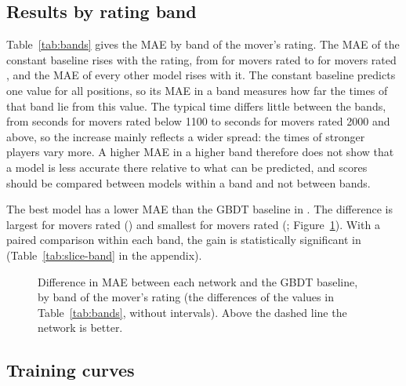 \documentclass[11pt]{article}
\begin{document}
\subsection{Results by rating band}

Table~\ref{tab:bands} gives the MAE by band of the mover's rating. The MAE of
the constant baseline rises with the rating, from  for movers
rated  to  for movers rated ,
and the MAE of every other model rises with it. The constant baseline
predicts one value for all positions, so its MAE in a band measures how far
the times of that band lie from this value.\iflook{} The typical time differs
little between the bands, from  seconds for
movers rated below 1100 to  seconds for movers
rated 2000 and above, so the increase mainly reflects a wider spread: the
times of stronger players vary more.\fi{} A higher MAE in a higher band
therefore does not show that a model is less accurate there relative to what
can be predicted, and scores should be compared between models within a band
and not between bands.

\begin{table}[htbp]\centering\small
{}
\caption{Test MAE by band of the mover's rating. The spread of the times
differs between bands, so values are comparable within a column and not
between columns.}
\label{tab:bands}
\end{table}

The best model has a lower MAE than the GBDT baseline in
. The difference is largest for movers rated
 () and smallest for movers
rated  (;
Figure~\ref{fig:bands}).\iflook{} With a paired comparison within each band,
the gain is statistically significant in 
(Table~\ref{tab:slice-band} in the appendix).\fi

\begin{figure}[htbp]\centering
{}
\caption{Difference in MAE between each network and the GBDT baseline, by
band of the mover's rating (the differences of the values in
Table~\ref{tab:bands}, without intervals). Above the dashed line the network
is better.}
\label{fig:bands}
\end{figure}

\subsection{Training curves}
\end{document}
